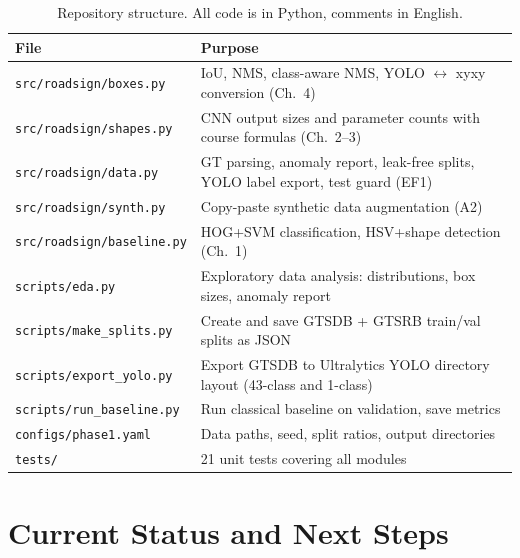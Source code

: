 \documentclass[12pt,a4paper]{article}
\begin{document}
\begin{table}[H]
\centering
\renewcommand{\arraystretch}{1.3}
\small
\begin{tabular}{lp{9cm}}
\toprule
\textbf{File} & \textbf{Purpose} \\
\midrule
\texttt{src/roadsign/boxes.py}    & IoU, NMS, class-aware NMS, YOLO $\leftrightarrow$ xyxy conversion (Ch.~4) \\
\texttt{src/roadsign/shapes.py}   & CNN output sizes and parameter counts with course formulas (Ch.~2--3) \\
\texttt{src/roadsign/data.py}     & GT parsing, anomaly report, leak-free splits, YOLO label export, test guard (EF1) \\
\texttt{src/roadsign/synth.py}    & Copy-paste synthetic data augmentation (A2) \\
\texttt{src/roadsign/baseline.py} & HOG+SVM classification, HSV+shape detection (Ch.~1) \\
\midrule
\texttt{scripts/eda.py}           & Exploratory data analysis: distributions, box sizes, anomaly report \\
\texttt{scripts/make\_splits.py}  & Create and save GTSDB + GTSRB train/val splits as JSON \\
\texttt{scripts/export\_yolo.py}  & Export GTSDB to Ultralytics YOLO directory layout (43-class and 1-class) \\
\texttt{scripts/run\_baseline.py} & Run classical baseline on validation, save metrics \\
\midrule
\texttt{configs/phase1.yaml}      & Data paths, seed, split ratios, output directories \\
\texttt{tests/}                   & 21 unit tests covering all modules \\
\bottomrule
\end{tabular}
\caption{Repository structure. All code is in Python, comments in English.}
\end{table}

\section{Current Status and Next Steps}
\label{sec:status}
\end{document}
